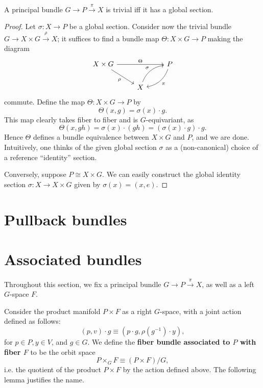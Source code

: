 \begin{thm}
    A principal bundle $G\to P\overset{\pi}{\to} X$ is trivial iff it has a global section.
\end{thm}
\begin{proof}
    Let $\sigma:X\to P$ be a global section. Consider now the trivial bundle $G\to X\times G\overset{\rho}{\to}X$; it suffices to find a bundle map $\Theta: X\times G\to P$ making the diagram 
    \begin{equation*}
        \begin{tikzcd}
            X\times G\arrow{rr}{\Theta}\arrow[swap]{rd}{\rho}&&P\arrow[bend left]{ld}{\pi}\\
            &X\arrow[bend left]{ru}{\sigma}&
        \end{tikzcd}
    \end{equation*}
    commute. Define the map $\Theta:X\times G\to P$ by
    \[\Theta(x,g)=\sigma(x)\cdot g.\]
    This map clearly takes fiber to fiber and is $G$-equivariant, as
    \[\Theta(x,gh)=\sigma(x)\cdot (gh)=(\sigma(x)\cdot g)\cdot g.\]
    Hence $\Theta$ defines a bundle equivalence between $X\times G$ and $P$, and we are done. Intuitively, one thinks of the given global
    section $\sigma$ as a (non-canonical) choice of a reference ``identity'' section.

    Conversely, suppose $P\cong X\times G$. We can easily construct the global identity section $\sigma: X\to X\times G$ given by $\sigma(x)=(x,e)$.
\end{proof}

\section{Pullback bundles}

\section{Associated bundles}

Throughout this section, we fix a principal bundle $G\to P\xrightarrow{\pi}X$, as well as a 
left $G$-space $F$. 

\begin{defn}
Consider the product manifold $P\times F$ as a right $G$-space, with a joint action defined as follows:
\[(p,v)\cdot g\equiv(p\cdot g, \rho(g^{-1})\cdot y),\]
for $p\in P,y\in V$, and $g\in G$. We define the \textbf{fiber bundle associated to $P$ with fiber $F$} to be the orbit space
\[P\times_G F\equiv (P\times F)/G,\]
i.e. the quotient of the product $P\times F$ by the action defined above. The following lemma
justifies the name.
\end{defn}

